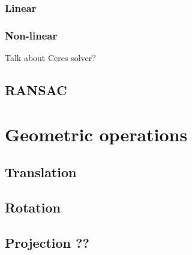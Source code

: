 \subsubsection{Linear}
\subsubsection{Non-linear}
Talk about Ceres solver?

\subsection{RANSAC}


\section{Geometric operations}
\subsection{Translation}
\subsection{Rotation}
\subsection{Projection ??}

